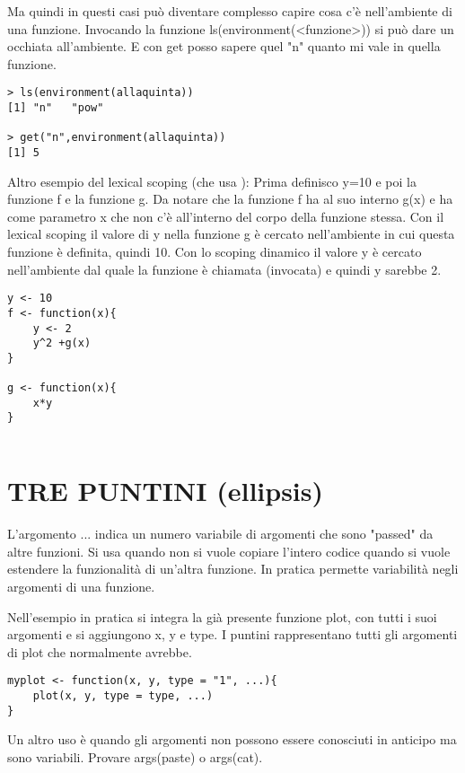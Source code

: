 Ma quindi in questi casi può diventare complesso capire cosa c'è nell'ambiente di una
funzione.
Invocando la funzione ls(environment(<funzione>)) si può dare un occhiata all'ambiente.
E con get posso sapere quel "n" quanto mi vale in quella funzione.
\begin{lstlisting}
> ls(environment(allaquinta))
[1] "n"   "pow"

> get("n",environment(allaquinta))
[1] 5
\end{lstlisting}
Altro esempio del lexical scoping (che usa \erre):
Prima definisco y=10 e poi la funzione f e la funzione g. Da notare che la funzione
f ha al suo interno g(x) e ha come parametro x che non c'è all'interno del corpo
della funzione stessa.
Con il lexical scoping il valore di y nella funzione g è cercato nell'ambiente
in cui questa funzione è definita, quindi 10.
Con lo scoping dinamico il valore y è cercato nell'ambiente dal quale la funzione
è chiamata (invocata) e quindi y sarebbe 2.
\begin{lstlisting}
y <- 10
f <- function(x){
	y <- 2
	y^2 +g(x)
}

g <- function(x){
	x*y
}
\end{lstlisting}

\begin{lstlisting}

\end{lstlisting}


\section{TRE PUNTINI (ellipsis)}
L'argomento ... indica un numero variabile di argomenti che sono "passed" da altre
funzioni.
Si usa quando non si vuole copiare l'intero codice quando si vuole estendere
la funzionalità di un'altra funzione.
In pratica permette variabilità negli argomenti di una funzione.

Nell'esempio in pratica si integra la già presente funzione plot, con tutti
i suoi argomenti e si aggiungono x, y e type. I puntini rappresentano tutti
gli argomenti di plot che normalmente avrebbe.
\begin{lstlisting}
myplot <- function(x, y, type = "1", ...){
	plot(x, y, type = type, ...)
}
\end{lstlisting}
Un altro uso è quando gli argomenti non possono essere conosciuti in anticipo 
ma sono variabili. Provare args(paste) o args(cat).

